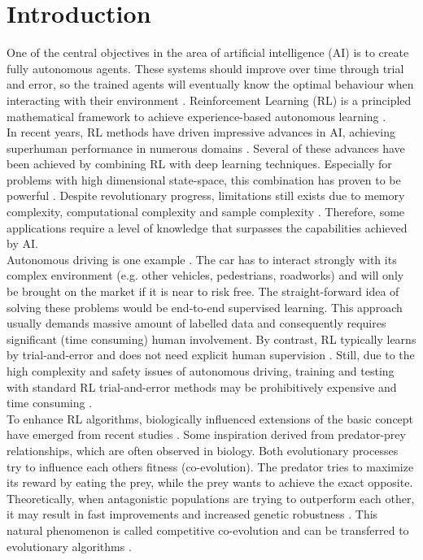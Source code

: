 \section{Introduction}
\label{Introduction}

One of the central objectives in the area of artificial intelligence (AI) is to create fully autonomous agents. These systems should improve over time through trial and error, so the trained agents will eventually know the optimal behaviour when interacting with their environment \cite{brundage17}. Reinforcement Learning (RL) is a principled mathematical framework to achieve experience-based autonomous learning \cite{strehl09}.\\
In recent years, RL methods have driven impressive advances in AI, achieving superhuman performance in numerous domains \cite{GoalphaGosilver2017mastering, chessSilver2017mastering}. Several of these advances have been achieved by combining RL with deep learning techniques. Especially for problems with high dimensional state-space, this combination has proven to be powerful \cite{lavet18}.
Despite revolutionary progress, limitations still exists due to memory complexity, computational complexity and sample complexity \cite{strehl09}. Therefore, some applications require a level of knowledge that surpasses the capabilities achieved by AI.\\
Autonomous driving is one example \cite{sallab17}. The car has to interact strongly with its complex environment (e.g. other vehicles, pedestrians, roadworks) and will only be brought on the market if it is near to risk free. The straight-forward idea of solving these problems would be end-to-end supervised learning. This approach usually demands massive amount of labelled data and consequently requires significant (time consuming) human involvement. By contrast, RL typically learns by trial-and-error and does not need explicit human supervision \cite{you17}. Still, due to the high complexity and safety issues of autonomous driving, training and testing with standard RL trial-and-error methods may be prohibitively expensive and time consuming \cite{uesato18}.\\
To enhance RL algorithms, biologically influenced extensions of the basic concept have emerged from recent studies \cite{environmentBansal2017Oct, gabor19, robustPinto2017Mar, uesato18}. Some inspiration derived from predator-prey relationships, which are often observed in biology. Both evolutionary processes try to influence each others fitness (co-evolution). The predator tries to maximize its reward by eating the prey, while the prey wants to achieve the exact opposite. Theoretically, when antagonistic populations are trying to outperform each other, it may result in fast improvements and increased genetic robustness \cite{berenos10}. This natural phenomenon is called competitive co-evolution and can be transferred to evolutionary algorithms \cite{gabor19}.\\
